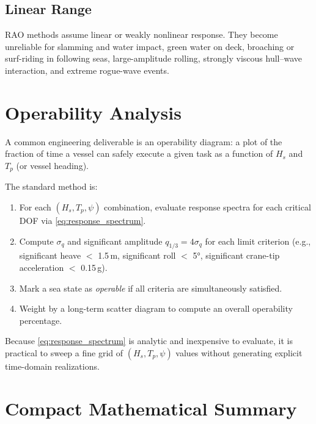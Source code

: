 \documentclass[journal,10pt,twocolumn]{IEEEtran}
\begin{document}
    \subsection{Linear Range}
    \label{sec:linearrange}

    RAO methods assume linear or weakly nonlinear response.
    They become unreliable for slamming and water impact, green water on deck,
    broaching or surf-riding in following seas, large-amplitude rolling, strongly
    viscous hull--wave interaction, and extreme rogue-wave events.

    \section{Operability Analysis}
    \label{sec:operability}

    A common engineering deliverable is an operability diagram: a plot of the fraction of
    time a vessel can safely execute a given task as a function of $H_s$ and $T_p$ (or
    vessel heading).

    The standard method is:
    \begin{enumerate}[leftmargin=1.4em]
        \item For each $(H_s,T_p,\psi)$ combination, evaluate response spectra for each
        critical DOF via \eqref{eq:response_spectrum}.
        \item Compute $\sigma_q$ and significant amplitude $q_{1/3}=4\sigma_q$ for each limit
        criterion (e.g., significant heave $<$ 1.5\,m, significant roll $<$ 5°, significant
        crane-tip acceleration $<$ 0.15\,g).
        \item Mark a sea state as \emph{operable} if all criteria are simultaneously satisfied.
        \item Weight by a long-term scatter diagram to compute an overall operability
        percentage.
    \end{enumerate}
    Because \eqref{eq:response_spectrum} is analytic and inexpensive to evaluate, it is
    practical to sweep a fine grid of $(H_s,T_p,\psi)$ values without generating explicit
    time-domain realizations.

    \section{Compact Mathematical Summary}
    \label{sec:summary}
\end{document}
